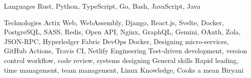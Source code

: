 
\begin{cvskills}
  \cvskill
    {Languages} %
    {Rust, Python, TypeScript, Go, Bash, JavaScript, Java} %

  \cvskill
    {Technologies} %
    {Actix Web, WebAssembly, Django, React.js, Svelte, Docker, PostgreSQL, SASS, Redis, Open API, Nginx, GraphQL, Gemini, OAuth, Zola, JSON-RPC, Hyperledger Fabric} %
  \cvskill
    {DevOps}
    {Docker, Designing micro-services, GitHub Actions, Travis CI, Netlify}
  \cvskill
    {Engineering}
    {Test-driven development, version control workflow, code review, systems designing}
  \cvskill
    {General skills}
    {Rapid leading, time management, team management, Linux Knowledge, Cooks a mean Biryani}
\end{cvskills}
